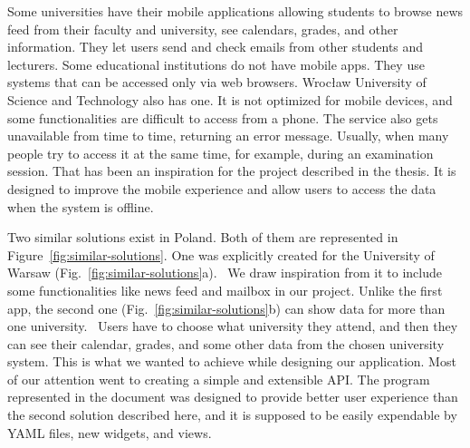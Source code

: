 Some universities have their mobile applications allowing students to browse news feed from their faculty and university, see calendars, grades, and other information. They let users send and check emails from other students and lecturers. Some educational institutions do not have mobile apps. They use systems that can be accessed only via web browsers. Wrocław University of Science and Technology also has one. It is not optimized for mobile devices, and some functionalities are difficult to access from a phone. The service also gets unavailable from time to time, returning an error message. Usually, when many people try to access it at the same time, for example, during an examination session. That has been an inspiration for the project described in the thesis. It is designed to improve the mobile experience and allow users to access the data when the system is offline.

Two similar solutions exist in Poland. Both of them are represented in Figure~\ref{fig:similar-solutions}. One was explicitly created for the University of Warsaw (Fig.~\ref{fig:similar-solutions}a).~\cite{mobilny-usos} We draw inspiration from it to include some functionalities like news feed and mailbox in our project. Unlike the first app, the second one (Fig.~\ref{fig:similar-solutions}b) can show data for more than one university.~\cite{kiedy-wyklad} Users have to choose what university they attend, and then they can see their calendar, grades, and some other data from the chosen university system. This is what we wanted to achieve while designing our application. Most of our attention went to creating a simple and extensible API. The program represented in the document was designed to provide better user experience than the second solution described here, and it is supposed to be easily expendable by YAML files, new widgets, and views.


